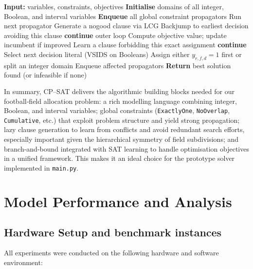 \documentclass[12pt]{article}
\begin{document}
\begin{algorithm}[H]
\caption{Simplified CP–SAT search loop for football scheduling}
\label{alg:cp_sat_loop}
\begin{algorithmic}[1]
\State \textbf{Input:} variables, constraints, objectives
\State \textbf{Initialise} domains of all integer, Boolean, and interval variables
\State \textbf{Enqueue} all global constraint propagators
        \State Run next propagator
            \State Generate a nogood clause via LCG
            \State Backjump to earliest decision avoiding this clause
            \State \textbf{continue} outer loop
        \EndIf
    \EndWhile
        \State Compute objective value; update incumbent if improved
        \State Learn a clause forbidding this exact assignment
        \State \textbf{continue}
    \EndIf
    \State Select next decision literal (VSIDS on Booleans)
    \State Assign either \(y_{r,f,d}=1\) first or split an integer domain
    \State Enqueue affected propagators
\EndWhile
\State \textbf{Return} best solution found (or infeasible if none)
\end{algorithmic}
\end{algorithm}

In summary, CP–SAT delivers the algorithmic building blocks needed for our football‐field allocation problem: a rich modelling language combining integer, Boolean, and interval variables; global constraints (\texttt{ExactlyOne}, \texttt{NoOverlap}, \texttt{Cumulative}, etc.) that exploit problem structure and yield strong propagation; lazy clause generation to learn from conflicts and avoid redundant search efforts, especially important given the hierarchical symmetry of field subdivisions; and branch-and-bound integrated with SAT learning to handle optimisation objectives in a unified framework. This makes it an ideal choice for the prototype solver implemented in \texttt{main.py}.

\newpage
\section{Model Performance and Analysis}

\subsection{Hardware Setup and benchmark instances}
All experiments were conducted on the following hardware and software environment:
\end{document}
